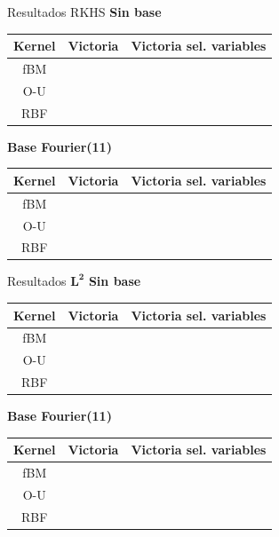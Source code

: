 \documentclass[10pt, spanish, professionalfonts]{beamer}
\newcommand{\cmark}{\ding{51}}%
\newcommand{\xmark}{\ding{55}}%
\begin{document}
\begin{frame}{Resultados RKHS}
\textbf{Sin base}
  \begin{table}
    \begin{tabular}{c|cc}
      Kernel & Victoria & Victoria sel. variables \\ \hline
      fBM & \cmark & \cmark\\
      O-U & \cmark & \cmark\\
      RBF & \cmark & \cmark
    \end{tabular}
  \end{table}

  \textbf{Base Fourier(11)}
  \begin{table}
    \begin{tabular}{c|cc}
      Kernel & Victoria & Victoria sel. variables \\ \hline
      fBM & \cmark &  \cmark\\
      O-U & \cmark & \xmark\\
      RBF & \cmark & \cmark
    \end{tabular}
  \end{table}
\end{frame}

\begin{frame}{Resultados \(\boldsymbol{L^2}\)}
\textbf{Sin base}
  \begin{table}
    \begin{tabular}{c|cc}
      Kernel & Victoria & Victoria sel. variables \\ \hline
      fBM & \xmark & \xmark\\
      O-U & \xmark & \xmark\\
      RBF & \xmark & \xmark
    \end{tabular}
  \end{table}

  \textbf{Base Fourier(11)}
  \begin{table}
    \begin{tabular}{c|cc}
      Kernel & Victoria & Victoria sel. variables \\ \hline
      fBM & \cmark &  \cmark\\
      O-U & \cmark & \cmark\\
      RBF & \xmark & \xmark
    \end{tabular}
  \end{table}
\end{frame}
\end{document}
